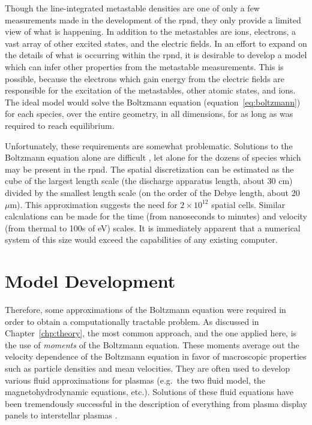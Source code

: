 Though the line-integrated metastable densities are one of only a few
measurements made in the development of the \acs{rpnd}, they only provide a
limited view of what is happening. In addition to the metastables are ions,
electrons, a vast array of other excited states, and the electric fields. In an
effort to expand on the details of what is occurring within the \acs{rpnd}, it
is desirable to develop a model which can infer other properties from the
metastable measurements. This is possible, because the electrons which gain
energy from the electric fields are responsible for the excitation of the
metastables, other atomic states, and ions. The ideal model would solve the
Boltzmann equation (equation~\ref{eq:boltzmann}) for each species, over the
entire geometry, in all dimensions, for as long as was required to reach
equilibrium.

Unfortunately, these requirements are somewhat problematic. Solutions to the
Boltzmann equation alone are difficult \cite{Lieberman2005}, let alone for the
dozens of species which may be present in the \acs{rpnd}. The spatial
discretization can be estimated as the cube of the largest length scale (the
discharge apparatus length, about 30 cm) divided by the smallest length scale
(on the order of the Debye length, about 20 $\mu$m). This approximation suggests
the need for $2\times10^{12}$ spatial cells. Similar calculations can be made
for the time (from nanoseconds to minutes) and velocity (from thermal to 100s of
eV) scales. It is immediately apparent that a numerical system of this size
would exceed the capabilities of any existing computer.

\section{Model Development}

Therefore, some approximations of the Boltzmann equation were required in order
to obtain a computationally tractable problem. As discussed in
Chapter~\ref{chp:theory}, the most common approach, and the one applied here, is
the use of \emph{moments} of the Boltzmann equation. These moments average out
the velocity dependence of the Boltzmann equation in favor of macroscopic
properties such as particle densities and mean velocities. They are often used
to develop various fluid approximations for plasmas \cite{Chen1984} (e.g.\ the
two fluid model, the magnetohydrodynamic equations, etc.). Solutions of
these fluid equations have been tremendously successful in the description of
everything from plasma display panels \cite{Rauf1999b} to interstellar plasmas
\cite{Linde1998}.

